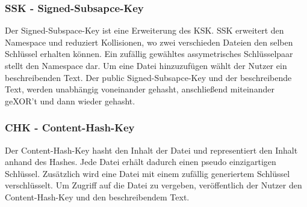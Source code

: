 \subsubsection{SSK - Signed-Subsapce-Key}
Der Signed-Subspace-Key ist eine Erweiterung des KSK. SSK erweitert den
Namespace und reduziert Kollisionen, wo zwei verschieden Dateien den
selben Schlüssel erhalten können.
Ein zufällig gewähltes assymetrisches Schlüsselpaar stellt den Namespace dar.
Um eine Datei hinzuzufügen wählt der Nutzer ein beschreibenden Text. Der
public Signed-Subsapce-Key und der beschreibende Text, werden unabhängig
voneinander gehasht, anschließend miteinander geXOR't und dann wieder gehasht.

\subsubsection{CHK - Content-Hash-Key}
Der Content-Hash-Key hasht den Inhalt der Datei und representiert den Inhalt
anhand des Hashes. Jede Datei erhält dadurch einen pseudo einzigartigen
Schlüssel. Zusätzlich wird eine Datei mit einem zufällig generiertem Schlüssel
verschlüsselt.
Um Zugriff auf die Datei zu vergeben, veröffentlich der Nutzer den
Content-Hash-Key und den beschreibendem Text.
